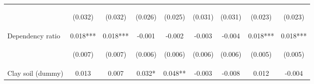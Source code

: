 \begin{center}
\begin{tabular}{lcccccccc}
\vspace{4pt} & \begin{footnotesize}(0.032)\end{footnotesize} & \begin{footnotesize}(0.032)\end{footnotesize} & \begin{footnotesize}(0.026)\end{footnotesize} & \begin{footnotesize}(0.025)\end{footnotesize} & \begin{footnotesize}(0.031)\end{footnotesize} & \begin{footnotesize}(0.031)\end{footnotesize} & \begin{footnotesize}(0.023)\end{footnotesize} & \begin{footnotesize}(0.023)\end{footnotesize} \\
Dependency ratio & 0.018*** & 0.018*** & -0.001 & -0.002 & -0.003 & -0.004 & 0.018*** & 0.018*** \\
\vspace{4pt} & \begin{footnotesize}(0.007)\end{footnotesize} & \begin{footnotesize}(0.007)\end{footnotesize} & \begin{footnotesize}(0.006)\end{footnotesize} & \begin{footnotesize}(0.006)\end{footnotesize} & \begin{footnotesize}(0.006)\end{footnotesize} & \begin{footnotesize}(0.006)\end{footnotesize} & \begin{footnotesize}(0.005)\end{footnotesize} & \begin{footnotesize}(0.005)\end{footnotesize} \\
Clay soil (dummy) & 0.013 & 0.007 & 0.032* & 0.048** & -0.003 & -0.008 & 0.012 & -0.004 \\

\end{tabular}
\end{center}
